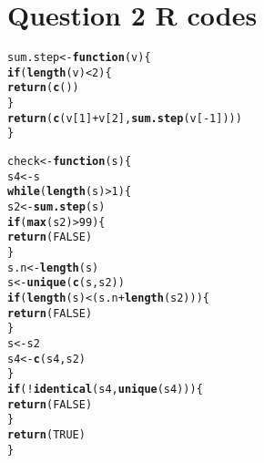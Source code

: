 \documentclass[12pt]{article}\usepackage[]{graphicx}\usepackage[]{color}
\makeatletter
\newcommand{\hlnum}[1]{\textcolor[rgb]{0.686,0.059,0.569}{#1}}%
\newcommand{\hlopt}[1]{\textcolor[rgb]{0,0,0}{#1}}%
\newcommand{\hlstd}[1]{\textcolor[rgb]{0.345,0.345,0.345}{#1}}%
\newcommand{\hlkwa}[1]{\textcolor[rgb]{0.161,0.373,0.58}{\textbf{#1}}}%
\newcommand{\hlkwb}[1]{\textcolor[rgb]{0.69,0.353,0.396}{#1}}%
\newcommand{\hlkwc}[1]{\textcolor[rgb]{0.333,0.667,0.333}{#1}}%
\newcommand{\hlkwd}[1]{\textcolor[rgb]{0.737,0.353,0.396}{\textbf{#1}}}%
\newenvironment{kframe}{%
 \def\at@end@of@kframe{}%
 \ifinner\ifhmode%
  \def\at@end@of@kframe{\end{minipage}}%
  \begin{minipage}{\columnwidth}%
 \fi\fi%
 \def\FrameCommand##1{\hskip\@totalleftmargin \hskip-\fboxsep
 \colorbox{shadecolor}{##1}\hskip-\fboxsep
     \hskip-\linewidth \hskip-\@totalleftmargin \hskip\columnwidth}%
 \MakeFramed {\advance\hsize-\width
   \@totalleftmargin\z@ \linewidth\hsize
   \@setminipage}}%
 {\par\unskip\endMakeFramed%
 \at@end@of@kframe}
\newenvironment{knitrout}{}{} %
\makeatother
\begin{document}
\section{Question 2 R codes}
\begin{knitrout}
\color{fgcolor}\begin{kframe}
\begin{alltt}
\hlstd{sum.step} \hlkwb{<-} \hlkwa{function}\hlstd{(}\hlkwc{v}\hlstd{)\{}
  \hlkwa{if} \hlstd{(}\hlkwd{length}\hlstd{(v)}\hlopt{<}\hlnum{2}\hlstd{)\{}
    \hlkwd{return}\hlstd{(}\hlkwd{c}\hlstd{())}
  \hlstd{\}}
  \hlkwd{return}\hlstd{(}\hlkwd{c}\hlstd{(v[}\hlnum{1}\hlstd{]}\hlopt{+}\hlstd{v[}\hlnum{2}\hlstd{],} \hlkwd{sum.step}\hlstd{(v[}\hlopt{-}\hlnum{1}\hlstd{])))}
\hlstd{\}}

\hlstd{check} \hlkwb{<-} \hlkwa{function}\hlstd{(}\hlkwc{s}\hlstd{)\{}
  \hlstd{s4} \hlkwb{<-} \hlstd{s}
  \hlkwa{while} \hlstd{(}\hlkwd{length}\hlstd{(s)}\hlopt{>}\hlnum{1}\hlstd{)\{}
    \hlstd{s2} \hlkwb{<-} \hlkwd{sum.step}\hlstd{(s)}
    \hlkwa{if} \hlstd{(}\hlkwd{max}\hlstd{(s2)}\hlopt{>}\hlnum{99}\hlstd{)\{}
      \hlkwd{return}\hlstd{(}\hlnum{FALSE}\hlstd{)}
    \hlstd{\}}
    \hlstd{s.n} \hlkwb{<-} \hlkwd{length}\hlstd{(s)}
    \hlstd{s} \hlkwb{<-} \hlkwd{unique}\hlstd{(}\hlkwd{c}\hlstd{(s, s2))}
    \hlkwa{if} \hlstd{(}\hlkwd{length}\hlstd{(s)}\hlopt{<}\hlstd{(s.n}\hlopt{+}\hlkwd{length}\hlstd{(s2)))\{}
      \hlkwd{return}\hlstd{(}\hlnum{FALSE}\hlstd{)}
    \hlstd{\}}
    \hlstd{s} \hlkwb{<-} \hlstd{s2}
    \hlstd{s4} \hlkwb{<-} \hlkwd{c}\hlstd{(s4, s2)}
  \hlstd{\}}
  \hlkwa{if} \hlstd{(}\hlopt{!}\hlkwd{identical}\hlstd{(s4,} \hlkwd{unique}\hlstd{(s4)))\{}
    \hlkwd{return}\hlstd{(}\hlnum{FALSE}\hlstd{)}
  \hlstd{\}}
  \hlkwd{return}\hlstd{(}\hlnum{TRUE}\hlstd{)}
\hlstd{\}}


\end{alltt}
\end{kframe}
\end{knitrout}
\end{document}
